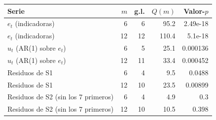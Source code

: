 \begin{tabular}{lrrrr}
\toprule
Serie & $m$ & g.l. & $Q(m)$ & Valor-$p$ \\
\midrule
$e_t$ (indicadoras) & 6 & 6 & 95.2 & 2.49e-18 \\
$e_t$ (indicadoras) & 12 & 12 & 110.4 & 5.1e-18 \\
$u_t$ (AR(1) sobre $e_t$) & 6 & 5 & 25.1 & 0.000136 \\
$u_t$ (AR(1) sobre $e_t$) & 12 & 11 & 33.4 & 0.000452 \\
Residuos de S1 & 6 & 4 & 9.5 & 0.0488 \\
Residuos de S1 & 12 & 10 & 23.5 & 0.00899 \\
Residuos de S2 (sin los 7 primeros) & 6 & 4 & 4.9 & 0.3 \\
Residuos de S2 (sin los 7 primeros) & 12 & 10 & 10.5 & 0.398 \\
\bottomrule
\end{tabular}

